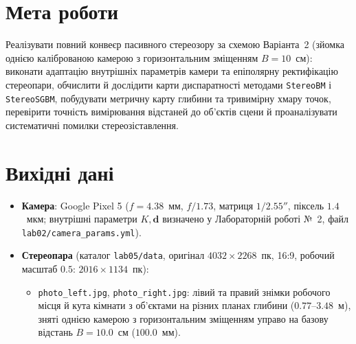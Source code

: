 \documentclass[14pt, a4paper]{extarticle}
\begin{document}


\section{Мета роботи}
Реалізувати повний конвеєр пасивного стереозору за схемою Варіанта~2 (зйомка однією каліброваною камерою з горизонтальним зміщенням $B = 10$~см): виконати адаптацію внутрішніх параметрів камери та епіполярну ректифікацію стереопари, обчислити й дослідити карти диспаратності методами \texttt{StereoBM} і \texttt{StereoSGBM}, побудувати метричну карту глибини та тривимірну хмару точок, перевірити точність вимірювання відстаней до об'єктів сцени й проаналізувати систематичні помилки стереозіставлення.

\section{Вихідні дані}
\begin{itemize}
    \item \textbf{Камера}: Google Pixel 5 ($f = 4.38$~мм, $f/1.73$, матриця $1/2.55''$, піксель $1.4$~мкм; внутрішні параметри $K, \mathbf{d}$ визначено у Лабораторній роботі №~2, файл \texttt{lab02/camera\_params.yml}).
    \item \textbf{Стереопара} (каталог \texttt{lab05/data}, оригінал $4032 \times 2268$~пк, 16:9, робочий масштаб $0.5$: $2016 \times 1134$~пк):
    \begin{itemize}
        \item \texttt{photo\_left.jpg}, \texttt{photo\_right.jpg}: лівий та правий знімки робочого місця й кута кімнати з об'єктами на різних планах глибини ($0.77$--$3.48$~м), зняті однією камерою з горизонтальним зміщенням управо на базову відстань $B = 10.0$~см ($100.0$~мм).
    \end{itemize}
\end{itemize}
\end{document}
